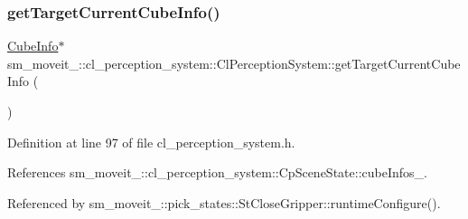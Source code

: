\subsubsection{\texorpdfstring{get\+Target\+Current\+Cube\+Info()}{getTargetCurrentCubeInfo()}}
{\footnotesize\ttfamily \hyperlink{structsm__moveit__4_1_1cl__perception__system_1_1CubeInfo}{Cube\+Info}$\ast$ sm\+\_\+moveit\+\_\+::cl\+\_\+perception\+\_\+system\+::\+Cl\+Perception\+System\+::get\+Target\+Current\+Cube\+Info (\begin{DoxyParamCaption}{ }\end{DoxyParamCaption})\hspace{0.3cm}{\ttfamily [inline]}}



Definition at line 97 of file cl\+\_\+perception\+\_\+system.\+h.



References sm\+\_\+moveit\+\_\+::cl\+\_\+perception\+\_\+system\+::\+Cp\+Scene\+State\+::cube\+Infos\+\_\+.



Referenced by sm\+\_\+moveit\+\_\+::pick\+\_\+states\+::\+St\+Close\+Gripper\+::runtime\+Configure().


